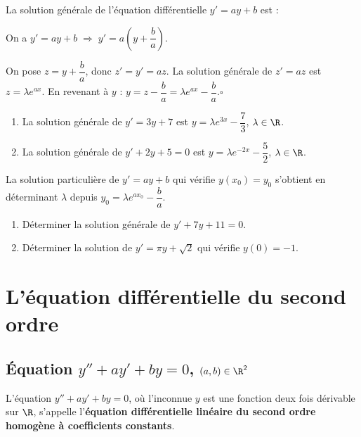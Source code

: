 \begin{Propriete}[]{}
La solution g\'en\'erale de l'\'equation diff\'erentielle $y'=ay+b$ est :
\end{Propriete}

\DemoTex On a $y'=ay+b \;\Rightarrow\; y'=a\!\left(y+\dfrac{b}{a}\right)$.

On pose $z=y+\dfrac{b}{a}$, donc $z'=y'=az$.
La solution g\'en\'erale de $z'=az$ est $z=\lambda e^{ax}$.
En revenant \`a $y$ : $y=z-\dfrac{b}{a}=\lambda e^{ax}-\dfrac{b}{a}$.\hfill$\square$

\Exemples
\begin{enumerate}
  \item La solution g\'en\'erale de $y'=3y+7$ est $y=\lambda e^{3x}-\dfrac{7}{3}$, $\lambda\in\R$.
  \item La solution g\'en\'erale de $y'+2y+5=0$ est $y=\lambda e^{-2x}-\dfrac{5}{2}$, $\lambda\in\R$.
\end{enumerate}

\begin{Remarque}
La solution particuli\`ere de $y'=ay+b$ qui v\'erifie $y(x_0)=y_0$ s'obtient en
d\'eterminant $\lambda$ depuis $y_0=\lambda e^{ax_0}-\dfrac{b}{a}$.
\end{Remarque}

\begin{Application}
\begin{enumerate}
  \item D\'eterminer la solution g\'en\'erale de $y'+7y+11=0$.
  \item D\'eterminer la solution de $y'=\pi y+\sqrt{2}$ qui v\'erifie $y(0)=-1$.
\end{enumerate}
\end{Application}

\section{L'\'equation diff\'erentielle du second ordre}

\subsection{\'Equation $y''+ay'+by=0$, $(a,b)\in\R^2$}

\begin{Definition}
L'\'equation $y''+ay'+by=0$, o\`u l'inconnue $y$ est une fonction deux fois d\'erivable
sur $\R$, s'appelle l'\textbf{\'equation diff\'erentielle lin\'eaire du second ordre homog\`ene
\`a coefficients constants}.
\end{Definition}

